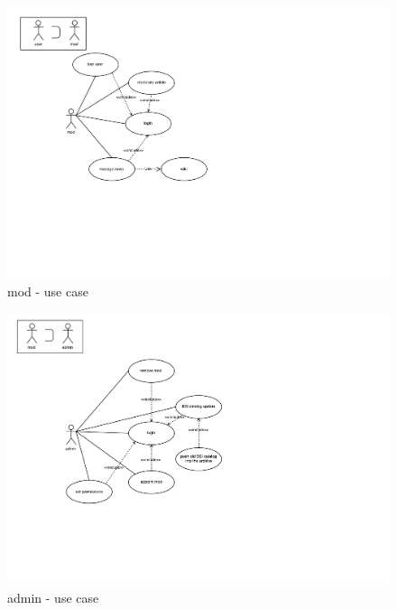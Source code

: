 \begin{figure}[h] 
    \centering
    \includegraphics[scale=1.0]{Pictures/Mod}
    \caption{mod - use case}
\end{figure}

\begin{figure}[h] 
    \centering
    \includegraphics[scale=1.0]{Pictures/Admin}
    \caption{admin - use case}
\end{figure}